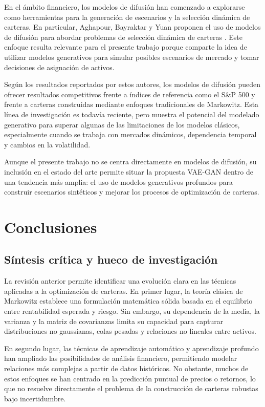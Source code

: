 En el ámbito financiero, los modelos de difusión han comenzado a explorarse como herramientas para la generación de escenarios y la selección dinámica de carteras. En particular, Aghapour, Bayraktar y Yuan proponen el uso de modelos de difusión para abordar problemas de selección dinámica de carteras \cite{aghapour2025solving}. Este enfoque resulta relevante para el presente trabajo porque comparte la idea de utilizar modelos generativos para simular posibles escenarios de mercado y tomar decisiones de asignación de activos.

Según los resultados reportados por estos autores, los modelos de difusión pueden ofrecer resultados competitivos frente a índices de referencia como el S\&P 500 y frente a carteras construidas mediante enfoques tradicionales de Markowitz. Esta línea de investigación es todavía reciente, pero muestra el potencial del modelado generativo para superar algunas de las limitaciones de los modelos clásicos, especialmente cuando se trabaja con mercados dinámicos, dependencia temporal y cambios en la volatilidad.

Aunque el presente trabajo no se centra directamente en modelos de difusión, su inclusión en el estado del arte permite situar la propuesta VAE-GAN dentro de una tendencia más amplia: el uso de modelos generativos profundos para construir escenarios sintéticos y mejorar los procesos de optimización de carteras.

\section{Conclusiones}

\subsection{Síntesis crítica y hueco de investigación}

La revisión anterior permite identificar una evolución clara en las técnicas aplicadas a la optimización de carteras. En primer lugar, la teoría clásica de Markowitz establece una formulación matemática sólida basada en el equilibrio entre rentabilidad esperada y riesgo. Sin embargo, su dependencia de la media, la varianza y la matriz de covarianzas limita su capacidad para capturar distribuciones no gaussianas, colas pesadas y relaciones no lineales entre activos.

En segundo lugar, las técnicas de aprendizaje automático y aprendizaje profundo han ampliado las posibilidades de análisis financiero, permitiendo modelar relaciones más complejas a partir de datos históricos. No obstante, muchos de estos enfoques se han centrado en la predicción puntual de precios o retornos, lo que no resuelve directamente el problema de la construcción de carteras robustas bajo incertidumbre.

